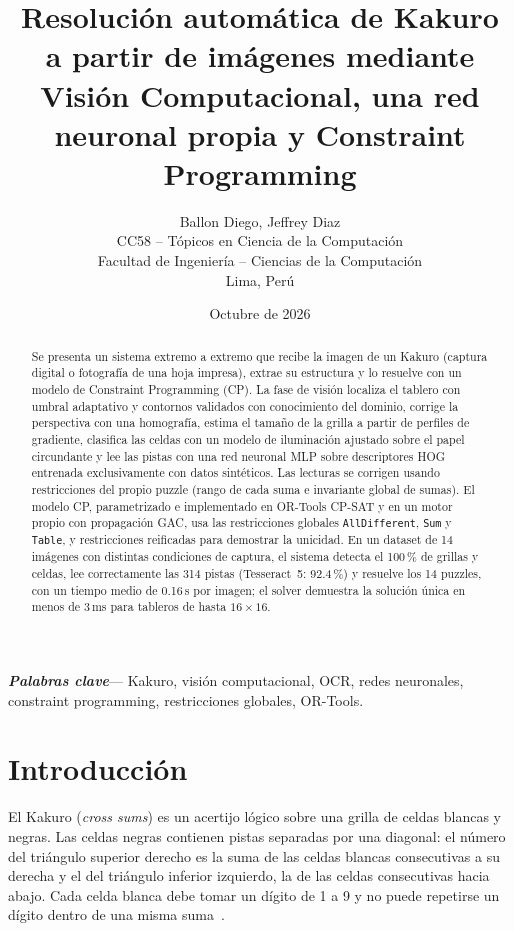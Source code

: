 \documentclass[conference,a4paper]{IEEEtran}\def\HAVEIEEE{1}%
\newcommand{\IEEEauthorblockN}[1]{#1\\}
\newcommand{\IEEEauthorblockA}[1]{{\small #1}}
\newenvironment{IEEEkeywords}{\par\noindent\textbf{\textit{Palabras clave}}---}{\par}
\begin{document}
\title{Resolución automática de Kakuro a partir de imágenes mediante Visión Computacional, una red neuronal propia y Constraint Programming}

\author{\IEEEauthorblockN{Ballon Diego, Jeffrey Diaz}
\IEEEauthorblockA{CC58 -- Tópicos en Ciencia de la Computación\\
Facultad de Ingeniería -- Ciencias de la Computación\\
Lima, Perú}}

\date{Octubre de 2026}
\maketitle

\begin{abstract}
Se presenta un sistema extremo a extremo que recibe la imagen de un Kakuro (captura digital o fotografía de una hoja impresa), extrae su estructura y lo resuelve con un modelo de Constraint Programming (CP). La fase de visión localiza el tablero con umbral adaptativo y contornos validados con conocimiento del dominio, corrige la perspectiva con una homografía, estima el tamaño de la grilla a partir de perfiles de gradiente, clasifica las celdas con un modelo de iluminación ajustado sobre el papel circundante y lee las pistas con una red neuronal MLP sobre descriptores HOG entrenada exclusivamente con datos sintéticos. Las lecturas se corrigen usando restricciones del propio puzzle (rango de cada suma e invariante global de sumas). El modelo CP, parametrizado e implementado en OR-Tools CP-SAT y en un motor propio con propagación GAC, usa las restricciones globales \texttt{AllDifferent}, \texttt{Sum} y \texttt{Table}, y restricciones reificadas para demostrar la unicidad. En un dataset de 14 imágenes con distintas condiciones de captura, el sistema detecta el 100\,\% de grillas y celdas, lee correctamente las 314 pistas (Tesseract~5: 92.4\,\%) y resuelve los 14 puzzles, con un tiempo medio de 0.16\,s por imagen; el solver demuestra la solución única en menos de 3\,ms para tableros de hasta $16\times16$.
\end{abstract}

\begin{IEEEkeywords}
Kakuro, visión computacional, OCR, redes neuronales, constraint programming, restricciones globales, OR-Tools.
\end{IEEEkeywords}

\section{Introducción}
El Kakuro (\emph{cross sums}) es un acertijo lógico sobre una grilla de celdas blancas y negras. Las celdas negras contienen pistas separadas por una diagonal: el número del triángulo superior derecho es la suma de las celdas blancas consecutivas a su derecha y el del triángulo inferior izquierdo, la de las celdas consecutivas hacia abajo. Cada celda blanca debe tomar un dígito de 1 a 9 y no puede repetirse un dígito dentro de una misma suma~\cite{wiki_kakuro}.
\end{document}
